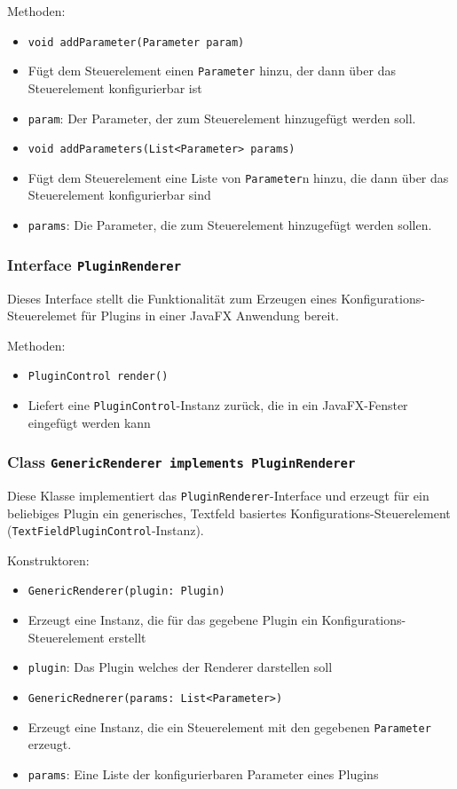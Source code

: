 \documentclass[parskip=full,11pt]{scrartcl}
\begin{document}
Methoden:

\begin{itemize}\itemsep -10pt
	\item \texttt{void addParameter(Parameter param)}
	\item[] Fügt dem Steuerelement einen \texttt{Parameter} hinzu, der dann über das Steuerelement konfigurierbar ist
	\item[] \texttt{param}: Der Parameter, der zum Steuerelement hinzugefügt werden soll.
	\item \texttt{void addParameters(List<Parameter> params)}
	\item[] Fügt dem Steuerelement eine Liste von \texttt{Parameter}n hinzu, die dann über das Steuerelement konfigurierbar sind
	\item[] \texttt{params}: Die Parameter, die zum Steuerelement hinzugefügt werden sollen.
\end{itemize}

\subsubsection{Interface \texttt{PluginRenderer}}

Dieses Interface stellt die Funktionalität zum Erzeugen eines Konfigurations-Steuerelemet für Plugins in einer JavaFX Anwendung bereit.

Methoden:

\begin{itemize}\itemsep -10pt
	\item \texttt{PluginControl render()}
	\item[] Liefert eine \texttt{PluginControl}-Instanz zurück, die in ein JavaFX-Fenster eingefügt werden kann
\end{itemize}

\subsubsection{Class \texttt{GenericRenderer implements PluginRenderer}}

Diese Klasse implementiert das \texttt{PluginRenderer}-Interface und erzeugt für ein beliebiges Plugin ein generisches, Textfeld basiertes Konfigurations-Steuerelement (\texttt{TextFieldPluginControl}-Instanz).

Konstruktoren:

\begin{itemize}\itemsep -10pt
	\item \texttt{GenericRenderer(plugin: Plugin)}
	\item[] Erzeugt eine Instanz, die für das gegebene Plugin ein Konfigurations-Steuerelement erstellt
	\item[] \texttt{plugin}: Das Plugin welches der Renderer darstellen soll
	\item \texttt{GenericRednerer(params: List<Parameter>)}
	\item[] Erzeugt eine Instanz, die ein Steuerelement mit den gegebenen \texttt{Parameter} erzeugt.
	\item[] \texttt{params}: Eine Liste der konfigurierbaren Parameter eines Plugins
\end{itemize} 
\end{document}
